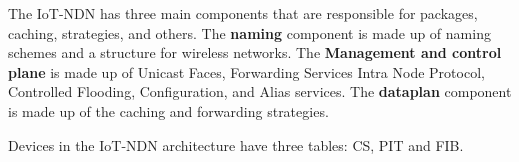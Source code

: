 \documentclass[conference]{IEEEtran}
\begin{document}
  The IoT-NDN has three main components that are responsible for packages, caching, strategies, and others.
  The \textbf{naming} component is made up of naming schemes and a structure for wireless networks.
  The \textbf{Management and control plane} is made up of Unicast Faces, Forwarding Services Intra Node Protocol, Controlled Flooding, Configuration, and Alias services. %
  The \textbf{dataplan} component is made up of the caching and forwarding strategies. 
  
  
  Devices in the IoT-NDN architecture have three tables: CS, PIT and FIB.
  
  
  
  
  
  
\end{document}
